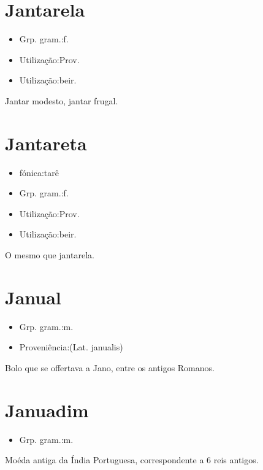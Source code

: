 \documentclass{article}
\begin{document}
\section{Jantarela}
\begin{itemize}
\item {Grp. gram.:f.}
\end{itemize}
\begin{itemize}
\item {Utilização:Prov.}
\end{itemize}
\begin{itemize}
\item {Utilização:beir.}
\end{itemize}
Jantar modesto, jantar frugal.
\section{Jantareta}
\begin{itemize}
\item {fónica:tarê}
\end{itemize}
\begin{itemize}
\item {Grp. gram.:f.}
\end{itemize}
\begin{itemize}
\item {Utilização:Prov.}
\end{itemize}
\begin{itemize}
\item {Utilização:beir.}
\end{itemize}
O mesmo que \textunderscore jantarela\textunderscore .
\section{Janual}
\begin{itemize}
\item {Grp. gram.:m.}
\end{itemize}
\begin{itemize}
\item {Proveniência:(Lat. \textunderscore janualis\textunderscore )}
\end{itemize}
Bolo que se offertava a Jano, entre os antigos Romanos.
\section{Januadim}
\begin{itemize}
\item {Grp. gram.:m.}
\end{itemize}
Moéda antiga da Índia Portuguesa, correspondente a 6 reis antigos.
\end{document}
